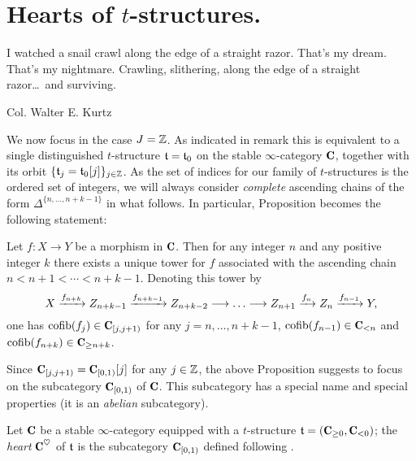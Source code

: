 \section{Hearts of $t$-structures.}
\setlength{\epigraphwidth}{.75\textwidth}
\epigraph{I watched a snail crawl along the edge of a straight razor. That's my dream. That's my nightmare. Crawling, slithering, along the edge of a straight razor\dots\ and surviving.
}{Col. Walter E. Kurtz}
\setlength{\epigraphwidth}{\DefaultEpigraphWidth}
We now focus in the case $J=\mathbb{Z} $. As indicated in remark  this is equivalent to a single distinguished $t$-structure $\mathfrak{t}=\mathfrak{t}_0$ on the stable $\infty$-category $\C$, together with its orbit $\{\mathfrak{t}_j = \mathfrak{t}_0[j]\}_{j\in\mathbb{Z}}$. As the set of indices for our family of $t$-structures is the ordered set of integers, we will always consider \emph{complete} ascending chains of the form $\Delta^{\{n,\dots,n+k-1\}}$ in what follows. In particular, Proposition  becomes the following statement:
\begin{proposition}
Let $f\colon X\to Y$ be a morphism in $\C$. Then for any integer $n$ and any positive integer $k$ there exists a unique tower for $f$ associated with the ascending chain $n<n+1<\cdots<n+k-1$. Denoting this tower by
\[
X \xto{f_{n+k}} Z_{n+k-1} \xto{f_{n+k-1}}Z_{n+k-2}\to\dots\to Z_{n+1} \xto{f_{n}} Z_{n} \xto{f_{n-1}} Y,
\]
one has
$\cofib(f_j)\in \C_{[j,j+1)}$ for any $j=n,\dots,n+k-1$,  $\cofib(f_{n-1})\in \C_{<n}$  and $\cofib(f_{n+k})\in \C_{\geq n+k}$.
\end{proposition}
Since $\C_{[j,j+1)}=\C_{[0,1)}[j]$ for any $j\in\mathbb{Z}$, the above Proposition suggests to focus on the subcategory $\C_{[0,1)}$ of $\C$. This subcategory has a special name and special properties (it is an \emph{abelian} subcategory).
\begin{definition}\label{coeur}
Let $\C$ be a stable $\infty$-category equipped with a $t$-structure $\tee=(\C_{\ge 0}, \C_{<0})$; the \emph{heart} $\C^\heart$ of $\mathfrak{t}$ is the subcategory $\C_{[0,1)}$ defined following \adef {}.
\end{definition}
